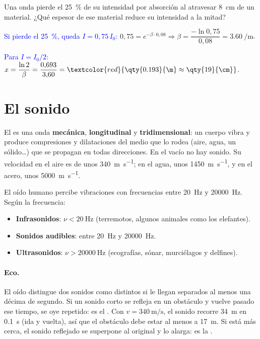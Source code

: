 \begin{exercise}
    Una onda pierde el \qty{25}{\percent} de su intensidad por absorción al atravesar \qty{8}{\cm} de un material. ¿Qué
    espesor de ese material reduce su intensidad a la mitad?
    \begin{solu}
        \textcolor{blue}{Si pierde el \qty{25}{\percent}, queda \(I = 0{,}75\,I_0\):}
        \(0{,}75 = e^{-\beta\cdot 0{,}08} \Rightarrow \beta = \dfrac{-\ln 0{,}75}{0{,}08} = \qty{3.60}{\per\m}\).

        \textcolor{blue}{Para \(I = I_0/2\):} \(x = \dfrac{\ln 2}{\beta} = \dfrac{0{,}693}{3{,}60} = \textcolor{red}{\qty{0.193}{\m} \approx \qty{19}{\cm}}\).
    \end{solu}
\end{exercise}

\section{El sonido}\label{sec:ond-sonido}

El  es una onda \textbf{mecánica}, \textbf{longitudinal} y \textbf{tridimensional}: un cuerpo vibra y produce
compresiones y dilataciones del medio que lo rodea (aire, agua, un sólido\ldots) que se propagan en todas direcciones. En el
vacío no hay sonido. Su velocidad en el aire es de unos \qty{340}{\m\per\second}; en el agua, unos \qty{1450}{\m\per\second}, y
en el acero, unos \qty{5000}{\m\per\second}.

El oído humano percibe vibraciones con frecuencias entre \qty{20}{\hertz} y \qty{20000}{\hertz}. Según la frecuencia:
\begin{itemize}
    \item \textbf{Infrasonidos}: \(\nu < \qty{20}{\hertz}\) (terremotos, algunos animales como los elefantes).
    \item \textbf{Sonidos audibles}: entre \qty{20}{\hertz} y \qty{20000}{\hertz}.
    \item \textbf{Ultrasonidos}: \(\nu > \qty{20000}{\hertz}\) (ecografías, sónar, murciélagos y delfines).
\end{itemize}

\paragraph{Eco.} El oído distingue dos sonidos como distintos si le llegan separados al menos una décima de segundo. Si un
sonido corto se refleja en un obstáculo y vuelve pasado ese tiempo, se oye repetido: es el . Con
\(v = \qty{340}{\m\per\second}\), el sonido recorre \qty{34}{\m} en \qty{0.1}{\second} (ida y vuelta), así que el obstáculo
debe estar al menos a \qty{17}{\m}. Si está más cerca, el sonido reflejado se superpone al original y lo alarga: es la
.

